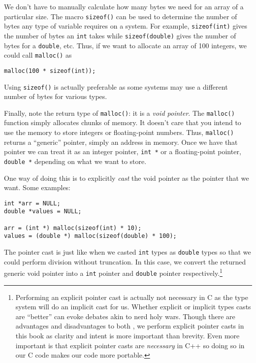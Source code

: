 We don't have to manually calculate how many bytes we need
for an array of a particular size.  The macro  
\texttt{sizeof()} can be used to determine the number
of bytes any type of variable requires on a system.  For example, 
\texttt{sizeof(int)} gives the number of bytes an \texttt{int}
takes while \texttt{sizeof(double)} gives the number of
bytes for a \texttt{double}, etc.  Thus, if we want to
allocate an array of 100 integers, we could call \texttt{malloc()}
as 

\texttt{malloc(100 * sizeof(int));}

Using \texttt{sizeof()} is actually preferable as some systems
may use a different number of bytes for various types.

Finally, note the return type of \texttt{malloc()}: it is a 
\emph{void pointer}.  The \texttt{malloc()} function 
simply allocates chunks of memory.  It doesn't care that you
intend to use the memory to store integers or floating-point
numbers.  Thus, \texttt{malloc()} returns a ``generic''
pointer, simply an address in memory.  Once we have that
pointer we can treat it as an integer pointer, \texttt{int *}
or a floating-point pointer, \texttt{double *} depending
on what we want to store.  

One way of doing this is to explicitly \emph{cast} the void
pointer as the pointer that we want.  Some examples:

\begin{verbatim}
int *arr = NULL;
double *values = NULL;

arr = (int *) malloc(sizeof(int) * 10);
values = (double *) malloc(sizeof(double) * 100);
\end{verbatim}

The pointer cast is just like when we casted \texttt{int}
types as \texttt{double} types so that we could perform
division without truncation.  In this case, we convert the
returned generic void pointer into a \texttt{int} pointer
and \texttt{double} pointer respectively.\footnote{Performing
an explicit pointer cast is actually not necessary in C as
the type system will do an implicit cast for us.  Whether
explicit or implicit types casts are ``better'' can evoke
debates akin to nerd holy wars.  Though there are advantages
and disadvantages to both \cite{stackOverflowCasts}, we perform explicit 
pointer casts in this book as clarity and intent is
more important than brevity.  Even more important is
that explicit pointer casts are \emph{necessary} in 
C++ so doing so in our C code makes our code
more portable.}

